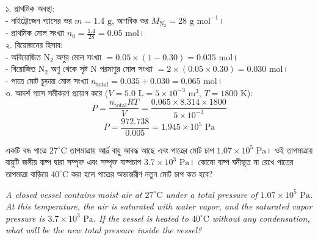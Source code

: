 \documentclass[12pt, a4paper]{article}
\begin{document}
{%
\begin{tcolorbox}[solutionbox={সমাধান (Solution)}]
\noindent
১. প্রাথমিক অবস্থা: \\
- নাইট্রোজেন গ্যাসের ভর $m = 1.4\text{ g}$, আণবিক ভর $M_{\text{N}_2} = 28\text{ g mol}^{-1}$। \\
- প্রাথমিক মোল সংখ্যা $n_0 = \frac{1.4}{28} = 0.05\text{ mol}$। \\
২. বিয়োজনের হিসাব: \\
- অবিয়োজিত $\text{N}_2$ অণুর মোল সংখ্যা $= 0.05 \times (1 - 0.30) = 0.035\text{ mol}$। \\
- বিয়োজিত $\text{N}_2$ অণু থেকে সৃষ্ট $\text{N}$ পরমাণুর মোল সংখ্যা $= 2 \times (0.05 \times 0.30) = 0.030\text{ mol}$। \\
- পাত্রে মোট চূড়ান্ত মোল সংখ্যা $n_{\text{total}} = 0.035 + 0.030 = 0.065\text{ mol}$। \\
৩. আদর্শ গ্যাস সমীকরণ প্রয়োগ করে ($V = 5.0\text{ L} = 5 \times 10^{-3}\text{ m}^3$, $T = 1800\text{ K}$):
\[ P = \frac{n_{\text{total}} R T}{V} = \frac{0.065 \times 8.314 \times 1800}{5 \times 10^{-3}} \]
\[ P = \frac{972.738}{0.005} = 1.945 \times 10^5\text{ Pa} \]
\end{tcolorbox}

\vspace{1.5em}

\begin{tcolorbox}[questionbox={প্রশ্ন (Question) 6}]
\noindent
একটি বন্ধ পাত্রে $27^\circ\text{C}$ তাপমাত্রায় আর্দ্র বায়ু আবদ্ধ আছে এবং পাত্রের মোট চাপ $1.07 \times 10^5\text{ Pa}$। ওই তাপমাত্রায় বায়ুটি জলীয় বাষ্প দ্বারা সম্পৃক্ত এবং সম্পৃক্ত বাষ্পচাপ $3.7 \times 10^3\text{ Pa}$। কোনো বাষ্প ঘনীভূত না রেখে পাত্রের তাপমাত্রা বাড়িয়ে $40^\circ\text{C}$ করা হলে পাত্রের অভ্যন্তরীণ নতুন মোট চাপ কত হবে?

\vspace{0.8em}
\begin{english}
\noindent\textit{\color{darkgray}
A closed vessel contains moist air at $27^\circ\text{C}$ under a total pressure of $1.07 \times 10^5\text{ Pa}$. At this temperature, the air is saturated with water vapor, and the saturated vapor pressure is $3.7 \times 10^3\text{ Pa}$. If the vessel is heated to $40^\circ\text{C}$ without any condensation, what will be the new total pressure inside the vessel?
}
\end{english}
\end{tcolorbox}

}
\end{document}
